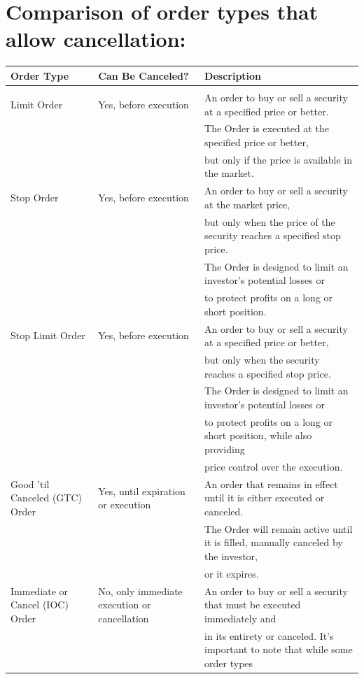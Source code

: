 \documentclass[11pt]{article}
\begin{document}
\section{Comparison of order types that allow cancellation:}
\label{sec:orgef26fd0}
\begin{center}
\begin{tabular}{lll}
\hline
Order Type & Can Be Canceled? & Description\\[0pt]
\hline
 &  & \\[0pt]
Limit Order & Yes, before execution & An order to buy or sell a security at a specified price or better.\\[0pt]
 &  & The Order is executed at the specified price or better,\\[0pt]
 &  & but only if the price is available in the market.\\[0pt]
\hline
Stop Order & Yes, before execution & An order to buy or sell a security at the market price,\\[0pt]
 &  & but only when the price of the security reaches a specified stop price.\\[0pt]
 &  & The Order is designed to limit an investor's potential losses or\\[0pt]
 &  & to protect profits on a long or short position.\\[0pt]
\hline
Stop Limit Order & Yes, before execution & An order to buy or sell a security at a specified price or better,\\[0pt]
 &  & but only when the security reaches a specified stop price.\\[0pt]
 &  & The Order is designed to limit an investor's potential losses or\\[0pt]
 &  & to protect profits on a long or short position, while also providing\\[0pt]
 &  & price control over the execution.\\[0pt]
\hline
Good 'til Canceled (GTC) Order & Yes, until expiration or execution & An order that remains in effect until it is either executed or canceled.\\[0pt]
 &  & The Order will remain active until it is filled, manually canceled by the investor,\\[0pt]
 &  & or it expires.\\[0pt]
\hline
Immediate or Cancel (IOC) Order & No, only immediate execution or cancellation & An order to buy or sell a security that must be executed immediately and\\[0pt]
 &  & in its entirety or canceled. It's important to note that while some order types\\[0pt]

\end{tabular}
\end{center}
\end{document}
